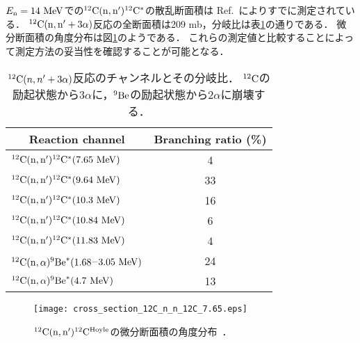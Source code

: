 \documentclass[../master]{subfiles}
\begin{document}
$E_{\rm n}=14~{\rm MeV}$での${}^{12}{\rm C}({\rm n},{\rm n}'){}^{12}{\rm C}^{*}$の散乱断面積は
Ref.~\cite{takahashietal,kondoetal}によりすでに測定されている．
${}^{12}{\rm C}({\rm n},{\rm n}'+3\alpha)$反応の全断面積は209 mb，分岐比は表\ref{tab::branchingratio}の通りである．
微分断面積の角度分布は図\ref{fig::sig_angle_dist}のようである．
これらの測定値と比較することによって測定方法の妥当性を確認することが可能となる．

\begin{table}
  \centering
  \caption[${}^{12}{\rm C}(n,n'+3\alpha)$反応のチャンネルとその分岐比．]
          {${}^{12}{\rm C}(n,n'+3\alpha)$反応のチャンネルとその分岐比．
  ${}^{12}{\rm C}$の励起状態から$3\alpha$に，${}^{9}{\rm Be}$の励起状態から$2\alpha$に崩壊する．}
  \label{tab::branchingratio}
  \begin{tabular}{lc}
    \toprule
    \multicolumn{1}{c}{Reaction channel} & Branching ratio (\%)\\
    \midrule
    ${}^{12}{\rm C}({\rm n},{\rm n}'){}^{12}{\rm C}^{*}(7.65~{\rm MeV})$ & 4\\
    ${}^{12}{\rm C}({\rm n},{\rm n}'){}^{12}{\rm C}^{*}(9.64~{\rm MeV})$ & 33\\
    ${}^{12}{\rm C}({\rm n},{\rm n}'){}^{12}{\rm C}^{*}(10.3~{\rm MeV})$ & 16\\
    ${}^{12}{\rm C}({\rm n},{\rm n}'){}^{12}{\rm C}^{*}(10.84~{\rm MeV})$ & 6\\
    ${}^{12}{\rm C}({\rm n},{\rm n}'){}^{12}{\rm C}^{*}(11.83~{\rm MeV})$ & 4\\
    ${}^{12}{\rm C}({\rm n},\alpha){}^{9}{\rm Be}^{*}(1.68$--$3.05~{\rm MeV})$ & 24\\
    ${}^{12}{\rm C}({\rm n},\alpha){}^{9}{\rm Be}^{*}(4.7~{\rm MeV})$ & 13\\
    \bottomrule
  \end{tabular}
\end{table}

\begin{figure}
  \centering
  \texttt{[image: cross\_section\_12C\_n\_n\_12C\_7.65.eps]}
  \caption[${}^{12}{\rm C}({\rm n},{\rm n}'){}^{12}{\rm C}^{\rm Hoyle}$の微分断面積の角度分布．]
          {${}^{12}{\rm C}({\rm n},{\rm n}'){}^{12}{\rm C}^{\rm Hoyle}$の微分断面積の角度分布~\cite{kondoetal}．}
  \label{fig::sig_angle_dist}
\end{figure}
\end{document}
